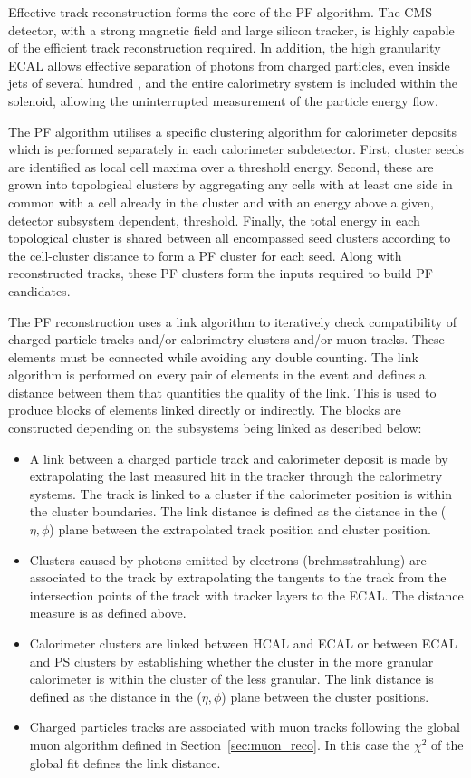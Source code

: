Effective track reconstruction forms the core of the PF algorithm. The CMS detector, with a strong magnetic field
and large silicon tracker, is highly capable of the efficient track
reconstruction required. In addition, the high granularity ECAL allows effective separation of photons from 
charged particles, even inside jets of several hundred \GeV, and the entire calorimetry system 
is included within the solenoid, allowing the uninterrupted measurement 
of the particle energy flow.

The PF algorithm utilises a specific clustering algorithm for calorimeter deposits which is performed separately 
in each calorimeter subdetector. First, cluster seeds are identified as local cell maxima over a threshold energy.
Second, these are grown into topological clusters by aggregating any cells with at least one side in common with
a cell already in the cluster and with an energy above a given, detector
subsystem dependent, threshold. Finally, the total energy in each topological cluster
is shared between all encompassed seed clusters according to the cell-cluster distance to 
form a PF cluster for each seed. Along with reconstructed tracks, these PF clusters form the inputs 
required to build PF candidates.

The PF reconstruction uses a link algorithm to iteratively check compatibility of charged particle tracks 
and/or calorimetry clusters and/or muon tracks. These elements must be connected while avoiding any double counting. 
The link algorithm is performed on every pair of elements in the event and defines a distance between them
that quantities the quality of the link. This is used to produce blocks of elements linked directly 
or indirectly. The blocks are constructed depending on the subsystems being linked as described below:

\begin{itemize}
\item A link between a charged particle track and calorimeter deposit is made by extrapolating the last measured
hit in the tracker through the calorimetry systems. The track is linked to a cluster if the calorimeter position
is within the cluster boundaries. The link distance is defined as the distance in the ($\eta,\phi$) plane between
the extrapolated track position and cluster position.
\item Clusters caused by photons emitted by electrons (brehmsstrahlung) are associated to the track by extrapolating
the tangents to the track from the intersection points of the track with tracker layers to the ECAL. The distance measure
is as defined above.
\item Calorimeter clusters are linked between HCAL and ECAL or between ECAL and PS clusters by establishing whether
the cluster in the more granular calorimeter is within the cluster of the less granular. The link distance is defined
as the distance in the ($\eta,\phi$) plane between the cluster positions.
\item Charged particles tracks are associated with muon tracks following the global muon algorithm defined in 
Section~\ref{sec:muon_reco}. In this case the $\chi^2$ of the global fit defines the link distance.
\end{itemize}

